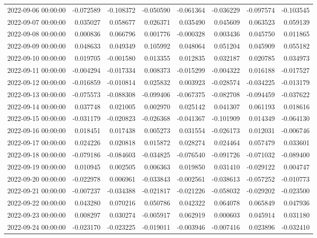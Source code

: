 \begin{tabular}{lrrrrrrr}
2022-09-06 00:00:00 & -0.072589 & -0.108372 & -0.050590 & -0.061364 & -0.036229 & -0.097574 & -0.103545 \\
2022-09-07 00:00:00 & 0.035027 & 0.058677 & 0.026371 & 0.035490 & 0.045609 & 0.063523 & 0.059139 \\
2022-09-08 00:00:00 & 0.000836 & 0.066796 & 0.001776 & -0.000328 & 0.003436 & 0.045750 & 0.011865 \\
2022-09-09 00:00:00 & 0.048633 & 0.049349 & 0.105992 & 0.048064 & 0.051204 & 0.045909 & 0.055182 \\
2022-09-10 00:00:00 & 0.019705 & -0.001580 & 0.013355 & 0.012835 & 0.032187 & 0.020785 & 0.034973 \\
2022-09-11 00:00:00 & -0.004294 & -0.017334 & 0.008373 & -0.015299 & -0.004322 & 0.016188 & -0.017527 \\
2022-09-12 00:00:00 & -0.016859 & -0.010814 & 0.025832 & 0.003923 & -0.028574 & -0.034225 & -0.013179 \\
2022-09-13 00:00:00 & -0.075573 & -0.088308 & -0.099406 & -0.067375 & -0.082708 & -0.094459 & -0.037622 \\
2022-09-14 00:00:00 & 0.037748 & 0.021005 & 0.002970 & 0.025142 & 0.041307 & 0.061193 & 0.018616 \\
2022-09-15 00:00:00 & -0.031179 & -0.020823 & -0.026368 & -0.041367 & -0.101909 & 0.014349 & -0.064130 \\
2022-09-16 00:00:00 & 0.018451 & 0.017438 & 0.005273 & 0.031554 & -0.026173 & 0.012031 & -0.006746 \\
2022-09-17 00:00:00 & 0.024226 & 0.020818 & 0.015872 & 0.028274 & 0.024464 & 0.057479 & 0.033601 \\
2022-09-18 00:00:00 & -0.079186 & -0.084603 & -0.034825 & -0.076540 & -0.091726 & -0.071032 & -0.089400 \\
2022-09-19 00:00:00 & 0.010945 & 0.002505 & 0.006363 & 0.019850 & 0.031410 & -0.029122 & 0.004747 \\
2022-09-20 00:00:00 & -0.022978 & 0.006961 & -0.033843 & -0.002561 & -0.038613 & -0.057252 & -0.010773 \\
2022-09-21 00:00:00 & -0.007237 & -0.034388 & -0.021817 & -0.021226 & -0.058032 & -0.029202 & -0.023500 \\
2022-09-22 00:00:00 & 0.043280 & 0.070216 & 0.050786 & 0.042322 & 0.064078 & 0.065849 & 0.047936 \\
2022-09-23 00:00:00 & 0.008297 & 0.030274 & -0.005917 & 0.062919 & 0.000603 & 0.045914 & 0.031180 \\
2022-09-24 00:00:00 & -0.023170 & -0.023225 & -0.019011 & -0.003946 & -0.007416 & 0.023896 & -0.032410 \\

\end{tabular}
